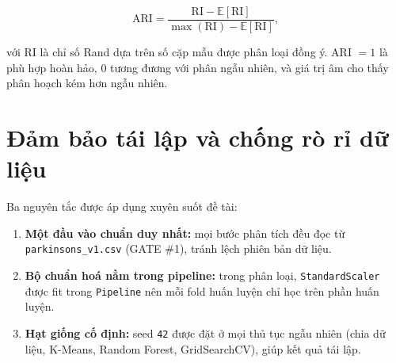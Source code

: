 \begin{equation}
\text{ARI} = \frac{\text{RI} - \mathbb{E}[\text{RI}]}{\max(\text{RI}) - \mathbb{E}[\text{RI}]},
\label{eq:ari}
\end{equation}

với RI là chỉ số Rand dựa trên số cặp mẫu được phân loại đồng ý. ARI $= 1$ là phù hợp hoàn
hảo, $0$ tương đương với phân ngẫu nhiên, và giá trị âm cho thấy phân hoạch kém hơn ngẫu
nhiên.

\section{Đảm bảo tái lập và chống rò rỉ dữ liệu}

Ba nguyên tắc được áp dụng xuyên suốt đề tài:
\begin{enumerate}
    \item \textbf{Một đầu vào chuẩn duy nhất:} mọi bước phân tích đều đọc từ
          \texttt{parkinsons\_v1.csv} (GATE \#1), tránh lệch phiên bản dữ liệu.
    \item \textbf{Bộ chuẩn hoá nằm trong pipeline:} trong phân loại, \texttt{StandardScaler}
          được fit trong \texttt{Pipeline} nên mỗi fold huấn luyện chỉ học trên phần huấn luyện.
    \item \textbf{Hạt giống cố định:} seed \texttt{42} được đặt ở mọi thủ tục ngẫu nhiên
          (chia dữ liệu, K-Means, Random Forest, GridSearchCV), giúp kết quả tái lập.
\end{enumerate}
